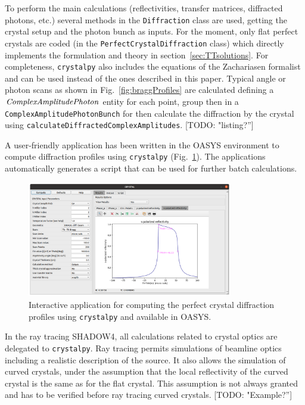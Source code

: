 \documentclass[preprint]{iucr}              %
\newcommand{\todo}[1]{{\color{red}[TODO: "#1'']}}
\begin{document}
To perform the main calculations (reflectivities, transfer matrices, diffracted photons, etc.) several methods in the {\tt Diffraction} class are used, getting the crystal setup and the photon bunch as inputs. For the moment, only flat perfect crystals are coded (in the {\tt PerfectCrystalDiffraction} class) which directly implements the formulation and theory in section~\ref{sec:TTsolutions}. For completeness, {\tt crystalpy} also includes the equations of the Zachariasen formalist~\cite{ZachariasenBook} and can be used instead of the ones described in this paper.
Typical angle or photon scans as shown in Fig.~\ref{fig:braggProfiles} are calculated defining a $\tt ComplexAmplitudePhoton$ entity for each point, group then in a {\tt ComplexAmplitudePhotonBunch} for then calculate the diffraction by the crystal using {\tt calculateDiffractedComplexAmplitudes}. \todo{listing?} 

A user-friendly application has been written in the OASYS environment to compute diffraction profiles using {\tt crystalpy} (Fig.~\ref{fig:xcrystal}). The applications automatically generates a script that can be used for further batch calculations. 

\begin{figure}
    \centering
    \includegraphics[width=0.8\textwidth]{figures/xcrystal.png}
    \caption{Interactive application for computing the perfect crystal diffraction profiles using {\tt crystalpy} and available in OASYS.  }
    \label{fig:xcrystal}
\end{figure}


In the ray tracing SHADOW4, all calculations related to crystal optics are delegated to  {\tt crystalpy}. Ray tracing permits simulations of beamline optics including a realistic description of the source. It also allows the simulation of curved crystals, under the assumption that the local reflectivity of the curved crystal is the same as for the flat crystal. This assumption is not always granted and has to be verified before ray tracing curved crystals. \todo{Example?}
\end{document}
